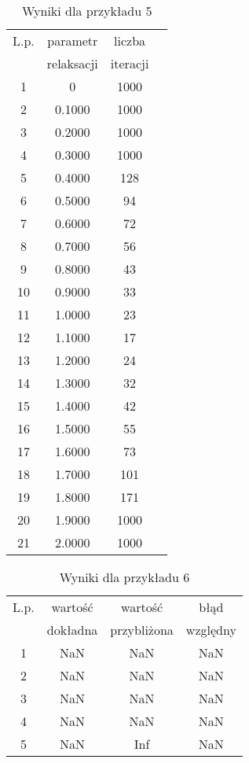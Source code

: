 \documentclass[12pt]{article}
\begin{document}
\begin{table}[H]
\caption{\footnotesize Wyniki dla przykładu 5} %
\renewcommand{\arraystretch}{1.1}
\centering\begin{tabular}{|c|c|c|c|}
\hline L.p. & parametr & liczba\\
 & relaksacji & iteracji\\
\hline 1 & 0 & 1000\\
\hline 2 & 0.1000 & 1000\\
\hline 3 & 0.2000 & 1000\\
\hline 4 & 0.3000 & 1000\\
\hline 5 & 0.4000 & 128\\
\hline 6 & 0.5000 & 94\\
\hline 7 & 0.6000 & 72\\
\hline 8 & 0.7000 & 56\\
\hline 9 & 0.8000 & 43\\
\hline 10 & 0.9000 & 33\\
\hline 11 & 1.0000 & 23\\
\hline 12 & 1.1000 & 17\\
\hline 13 & 1.2000 & 24\\
\hline 14 & 1.3000 & 32\\
\hline 15 & 1.4000 & 42\\
\hline 16 & 1.5000 & 55\\
\hline 17 & 1.6000 & 73\\
\hline 18 & 1.7000 & 101\\
\hline 19 & 1.8000 & 171\\
\hline 20 & 1.9000 & 1000\\
\hline 21 & 2.0000 & 1000\\

\end{tabular}
\end{table}

\begin{table}[H]
\caption{\footnotesize Wyniki dla przykładu 6} %
\renewcommand{\arraystretch}{1.1}
\centering\begin{tabular}{|c|c|c|c|}
\hline L.p. & wartość & wartość & błąd\\
 & dokładna & przybliżona & względny\\
\hline 1 & NaN & NaN & NaN\\
\hline 2 & NaN & NaN & NaN\\
\hline 3 & NaN & NaN & NaN\\
\hline 4 & NaN & NaN & NaN\\
\hline 5 & NaN & Inf & NaN\\
\end{tabular}
\end{table}
\end{document}
